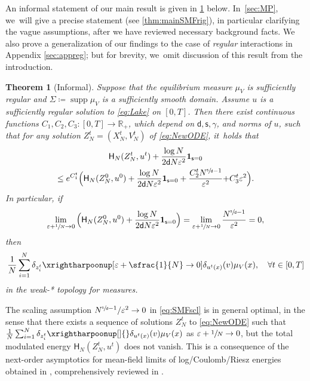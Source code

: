 \documentclass[JEP,XML,SOM,Unicode,published]{cedram}
\theoremstyle{plain}
\newtheorem{thm}{Theorem}[section]
\theoremstyle{definition}
\DeclareMathOperator{\supp}{supp}
\newcommand{\R}{{\mathbb{R}}}
\let\ga\gamma
\let\vep\varepsilon
\let\uz Z
\newcommand{\indic}{\mathbf{1}}
\newcommand{\Hr}{\mathsf{H}}
\renewcommand{\d}{\mathsf{d}}
\newcommand{\s}{\mathsf{s}}
\begin{document}
An informal statement of our main result is given in \cref{thm:mainSMF} below. In~\cref{sec:MP}, we~will give a precise statement (see \cref{thm:mainSMFrig}), in particular clarifying the vague assumptions, after we have reviewed necessary background facts. We also prove a generalization of our findings to the case of \emph{regular} interactions in Appendix \ref{sec:appreg}; but for brevity, we~omit discussion of this result from the introduction.

\begin{thm}[Informal]\label{thm:mainSMF}
Suppose that the equilibrium measure $\mu_V$ is sufficiently regular and $\Sigma\coloneqq\supp \mu_V$ {is a sufficiently smooth domain}. Assume $u$ is a sufficiently regular solution to \eqref{eq:Lake} on $[0,T]$. Then there exist continuous functions $C_1,C_2,C_3: [0,T]\to \R_+$, which depend on $\d,\s, \ga$, and norms of $u$, such that for any solution $Z_N^t = (X_N^t, V_N^t)$ of \eqref{eq:NewODE}, it~holds that
\begin{multline}\label{eq:mainSMF}
\Hr_{N}(\uz_N^t, u^t) + \frac{\log N}{2\d N\vep^2}\indic_{\s=0}\\
\leq e^{C_1^t}\Big(\Hr_{N}(\uz_N^0, u^0) +\frac{\log N}{2\d N\vep^2}\indic_{\s=0} + \frac{C_2^tN^{\sfrac{\s}{\d}-1}}{\vep^2} {+ C_3^t\vep^2} \Big).
\end{multline}
In particular, if
\begin{equation}\label{eq:SMFscl}
\lim_{\vep+\sfrac{1}{N}\to 0} \Big(\Hr_{N}(\uz_N^0,u^0) + \frac{\log N}{2\d N\vep^2}\indic_{\s=0}\Big) = \lim_{\vep+\sfrac{1}{N}\to 0} \frac{N^{\sfrac{\s}{\d}-1}}{\vep^2} =0,
\end{equation}
then
\begin{equation}\label{eq:SMFweak}
\frac1N\sum_{i=1}^N\delta_{z_i^t} \xrightharpoonup[\vep+\sfrac{1}{N}\to 0]{} \delta_{u^t(x)}(v)\mu_V(x), \quad \forall t\in [0,T]
\end{equation}
in the weak-* topology for measures.
\end{thm}

The scaling assumption $N^{\sfrac{\s}{\d}-1}/\vep^2\to 0$ in \eqref{eq:SMFscl} is in general optimal, in the sense that there exists a sequence of solutions $\uz_N^t$ to \eqref{eq:NewODE} such that ${\frac1N\sum_{i=1}^N \delta_{z_i^t}} \xrightharpoonup[]{} \delta_{u^t(x)}(v)\mu_V(x)$ as $\vep+\sfrac1N\to 0$, but the total modulated energy $\Hr_{N}(\uz_N^t,u^t)$ does not vanish. This is a consequence of the next-order asymptotics for mean-field limits of log/Coulomb/Riesz energies obtained in \cite{SS2015,SS2015log,RS2016,PS2017}, comprehensively reviewed in \cite{SerfatyLN}.
\end{document}

